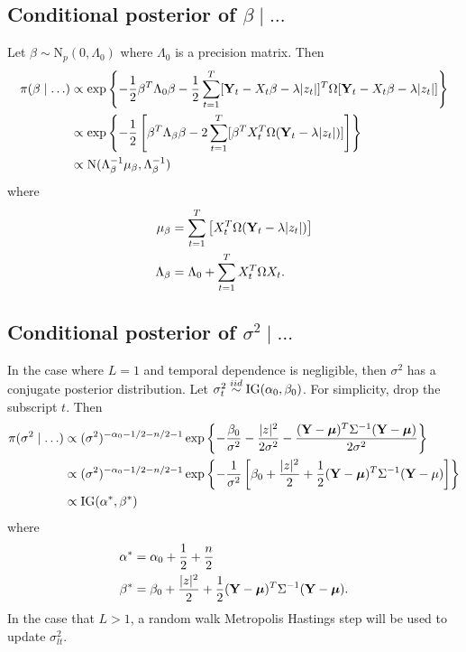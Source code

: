 \documentclass[useAMS,usenatbib,referee]{biomweb}
\begin{document}
\subsection*{Conditional posterior of $\beta \mid \ldots$}\label{s:betapost}
Let $\beta \sim \mbox{N}_{p}(0, \Lambda_0)$ where $\Lambda_0$ is a precision matrix. Then
\begin{align*}
    \pi(\beta \mid \ldots) & \propto \exp \left\{ - \frac{ 1 }{ 2 } \beta^T \Lambda_0 \beta - \frac{ 1 }{ 2 } \sum_{t = 1 }^T [\mbox{\bf Y}_t - X_t \beta - \lambda |z_t|]^T \Omega [\mbox{\bf Y}_t - X_t \beta - \lambda |z_t|] \right\}\\
     & \propto \exp \left\{ -\frac{ 1 }{ 2 } \left[ \beta^T \Lambda_\beta \beta  - 2 \sum_{ t = 1 }^T [ \beta^T X_t^T \Omega (\mbox{\bf Y}_t - \lambda |z_t| )] \right] \right\}\\
     & \propto \mbox{N} ( \Lambda_\beta^{-1} \mu_\beta , \Lambda_\beta^{-1})
\end{align*}
where
\begin{align*}
    \mu_\beta &= \sum_{t=1}^{T} \left[ X_t^T \Omega (\mbox{\bf Y}_t - \lambda |z_t|) \right]\\
    \Lambda_\beta &= \Lambda_0 + \sum_{ t = 1 }^{ T} X_t^T \Omega X_t.
\end{align*}

\subsection*{Conditional posterior of $\sigma^2 \mid \ldots$}\label{s:sigpost}
In the case where $L = 1$ and temporal dependence is negligible, then $\sigma^2$ has a conjugate posterior distribution.
Let $\sigma_t^2 \stackrel{iid}{\sim} \mbox{IG}(\alpha_0, \beta_0)$. For simplicity, drop the subscript $t$. Then
\begin{align*}
    \pi(\sigma^2 \mid \ldots) & \propto (\sigma^2)^{ -\alpha_0 - 1 / 2 - n / 2 - 1} \exp \left\{ -\frac{\beta_0}{\sigma^2} - \frac{ |z|^2 }{2 \sigma^2} - \frac{ (\mbox{\bf Y} - \mbox{\boldmath $\mu$})^T \Sigma^{-1} (\mbox{\bf Y} - \mbox{\boldmath $\mu$}) }{2 \sigma^2} \right\} \\
    & \propto (\sigma^2)^{ -\alpha_0 - 1 / 2 - n / 2 - 1} \exp \left\{ - \frac{ 1 }{ \sigma^2 } \left[\beta_0 + \frac{ |z|^2 }{ 2 } + \frac{ 1 }{ 2 } (\mbox{\bf Y} - \mbox{\boldmath $\mu$})^T \Sigma^{-1} (\mbox{\bf Y} - \mu) \right] \right\} \\
    & \propto \mbox{IG} (\alpha^*, \beta^*)
\end{align*}
where
\begin{align*}
    \alpha^* &= \alpha_0 + \frac{1}{2} + \frac{n}{2} \\
    \beta^* &= \beta_0 + \frac{ |z|^2 }{ 2 } + \frac{ 1 }{ 2 }(\mbox{\bf Y} - \mbox{\boldmath $\mu$})^T \Sigma^{-1} (\mbox{\bf Y} - \mbox{\boldmath $\mu$}).
\end{align*}
In the case that $L > 1$, a random walk Metropolis Hastings step will be used to update $\sigma^2_{lt}$.
\end{document}
